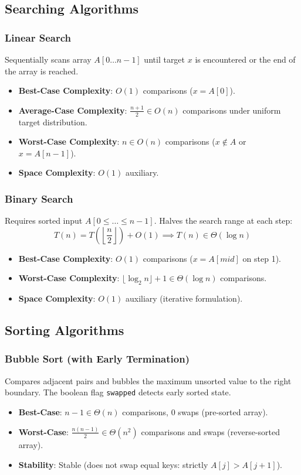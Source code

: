 \documentclass[11pt,a4paper]{article}
\theoremstyle{definition}
\theoremstyle{plain}
\theoremstyle{remark}
\begin{document}
\subsection{Searching Algorithms}

\subsubsection{Linear Search}
Sequentially scans array $A[0 \dots n-1]$ until target $x$ is encountered or the end of the array is reached.
\begin{itemize}
    \item \textbf{Best-Case Complexity}: $O(1)$ comparisons ($x = A[0]$).
    \item \textbf{Average-Case Complexity}: $\frac{n+1}{2} \in O(n)$ comparisons under uniform target distribution.
    \item \textbf{Worst-Case Complexity}: $n \in O(n)$ comparisons ($x \notin A$ or $x = A[n-1]$).
    \item \textbf{Space Complexity}: $O(1)$ auxiliary.
\end{itemize}

\subsubsection{Binary Search}
Requires sorted input $A[0 \le \dots \le n-1]$. Halves the search range at each step:
\begin{equation}
T(n) = T\left(\left\lfloor \frac{n}{2} \right\rfloor\right) + O(1) \implies T(n) \in \Theta(\log n)
\end{equation}
\begin{itemize}
    \item \textbf{Best-Case Complexity}: $O(1)$ comparisons ($x = A[mid]$ on step 1).
    \item \textbf{Worst-Case Complexity}: $\lfloor \log_2 n \rfloor + 1 \in \Theta(\log n)$ comparisons.
    \item \textbf{Space Complexity}: $O(1)$ auxiliary (iterative formulation).
\end{itemize}

\subsection{Sorting Algorithms}

\subsubsection{Bubble Sort (with Early Termination)}
Compares adjacent pairs and bubbles the maximum unsorted value to the right boundary. The boolean flag \texttt{swapped} detects early sorted state.
\begin{itemize}
    \item \textbf{Best-Case}: $n - 1 \in \Theta(n)$ comparisons, $0$ swaps (pre-sorted array).
    \item \textbf{Worst-Case}: $\frac{n(n-1)}{2} \in \Theta(n^2)$ comparisons and swaps (reverse-sorted array).
    \item \textbf{Stability}: Stable (does not swap equal keys: strictly $A[j] > A[j+1]$).
\end{itemize}
\end{document}

